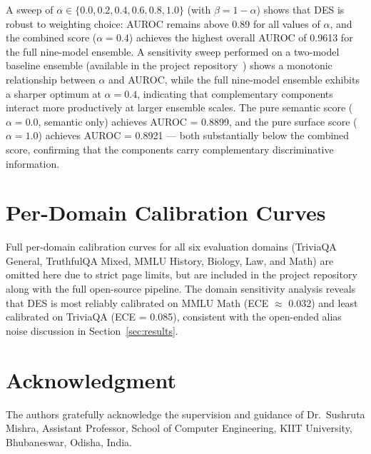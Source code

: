 \documentclass[journal]{IEEEtran}
\begin{document}
A sweep of $\alpha \in \{0.0, 0.2, 0.4, 0.6, 0.8, 1.0\}$ (with
$\beta = 1 - \alpha$) shows that DES is robust to weighting choice:
AUROC remains above 0.89 for all values of $\alpha$, and the combined
score ($\alpha{=}0.4$) achieves the highest overall AUROC of 0.9613 for the 
full nine-model ensemble.
A sensitivity sweep performed on a two-model baseline ensemble 
(available in the project repository~\cite{desrepo2025}) shows a monotonic relationship 
between $\alpha$ and AUROC, while the full nine-model ensemble exhibits a sharper 
optimum at $\alpha=0.4$, indicating that complementary components interact more 
productively at larger ensemble scales.
The pure semantic score ($\alpha{=}0.0$, semantic only) achieves
AUROC = 0.8899, and the pure surface score ($\alpha{=}1.0$) achieves
AUROC = 0.8921 --- both substantially below the combined score, confirming
that the components carry complementary discriminative information.

\section{Per-Domain Calibration Curves}
\label{app:domain}

Full per-domain calibration curves for all six evaluation domains
(TriviaQA General, TruthfulQA Mixed, MMLU History, Biology, Law, and Math)
are omitted here due to strict page limits, but are included in the 
project repository~\cite{desrepo2025} along with the full open-source pipeline.
The domain sensitivity analysis reveals that DES is most reliably calibrated
on MMLU Math (ECE $\approx$ 0.032) and least calibrated on TriviaQA
(ECE = 0.085), consistent with the open-ended alias noise discussion in
Section~\ref{sec:results}.


\section*{Acknowledgment}
The authors gratefully acknowledge the supervision and guidance of
Dr.~Sushruta Mishra, Assistant Professor, School of Computer Engineering,
KIIT University, Bhubaneswar, Odisha, India.



\end{document}
